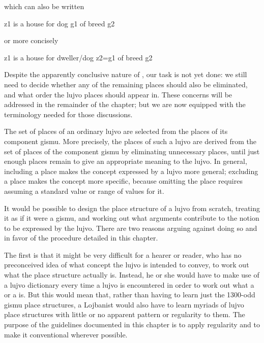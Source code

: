 {\noindent}which can also be written
\begin{example}
z1 is a house for dog g1 of breed g2
\end{example}

{\noindent}or more concisely
\begin{example}
z1 is a house for dweller/dog z2=g1 of breed g2
\end{example}

Despite the apparently conclusive nature of , our task is not yet done: we
    still need to decide whether any of the remaining places should
    also be eliminated, and what order the lujvo places should
    appear in. These concerns will be addressed in the remainder of
    the chapter; but we are now equipped with the terminology
    needed for those discussions.



The set of places of an ordinary lujvo are selected from the
    places of its component gismu. More precisely, the places of
    such a lujvo are derived from the set of places of the
    component gismu by eliminating unnecessary places, until just
    enough places remain to give an appropriate meaning to the
    lujvo. In general, including a place makes the concept
    expressed by a lujvo more general; excluding a place makes the
    concept more specific, because omitting the place requires
    assuming a standard value or range of values for it.

It would be possible to design the place structure of a
    lujvo from scratch, treating it as if it were a gismu, and
    working out what arguments contribute to the notion to be
    expressed by the lujvo. There are two reasons arguing against
    doing so and in favor of the procedure detailed in this
    chapter.

The first is that it might be very difficult for a hearer or
    reader, who has no preconceived idea of what concept the lujvo
    is intended to convey, to work out what the place structure
    actually is. Instead, he or she would have to make use of a
    lujvo dictionary every time a lujvo is encountered in order to
    work out what a  or a  is. But this
    would mean that, rather than having to learn just the 1300-odd
    gismu place structures, a Lojbanist would also have to learn
    myriads of lujvo place structures with little or no apparent
    pattern or regularity to them. The purpose of the guidelines
    documented in this chapter is to apply regularity and to make
    it conventional wherever possible.

